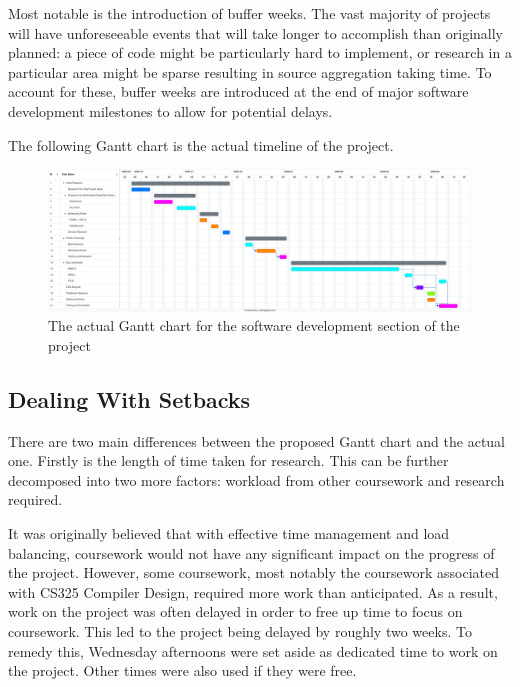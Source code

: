 Most notable is the introduction of buffer weeks. The vast majority of projects will have unforeseeable events that will take longer to accomplish than originally planned: a piece of code might be particularly hard to implement, or research in a particular area might be sparse resulting in source aggregation taking time. To account for these, buffer weeks are introduced at the end of major software development milestones to allow for potential delays.

The following Gantt chart is the actual timeline of the project.

\begin{figure}[H]
    \centering
    \includegraphics[width=1\linewidth]{dissertation/figures/actual-gantt.png}
    \caption{The actual Gantt chart for the software development section of the project}
    \label{fig:actual-gantt}
\end{figure}



\subsection{Dealing With Setbacks}

There are two main differences between the proposed Gantt chart and the actual one. Firstly is the length of time taken for research. This can be further decomposed into two more factors: workload from other coursework and research required. 

It was originally believed that with effective time management and load balancing, coursework would not have any significant impact on the progress of the project. However, some coursework, most notably the coursework associated with CS325 Compiler Design, required more work than anticipated. As a result, work on the project was often delayed in order to free up time to focus on coursework. This led to the project being delayed by roughly two weeks. To remedy this, Wednesday afternoons were set aside as dedicated time to work on the project. Other times were also used if they were free. 

